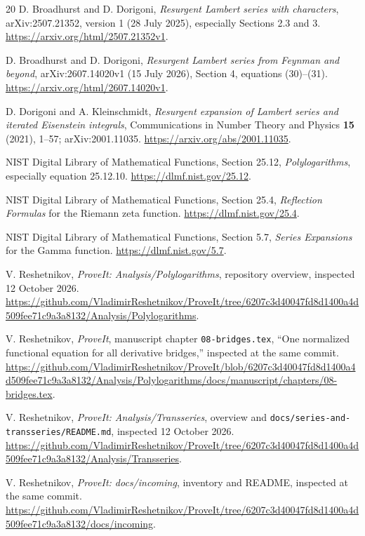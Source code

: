 \documentclass[11pt,a4paper]{article}
\numberwithin{equation}{section}
\theoremstyle{definition}\newtheorem{definition}[theorem]{Definition}
\theoremstyle{remark}\newtheorem{remark}[theorem]{Remark}
\begin{document}
\begin{thebibliography}{20}
D. Broadhurst and D. Dorigoni,
\emph{Resurgent Lambert series with characters},
arXiv:2507.21352, version 1 (28 July 2025), especially Sections 2.3 and 3.
\url{https://arxiv.org/html/2507.21352v1}.

D. Broadhurst and D. Dorigoni,
\emph{Resurgent Lambert series from Feynman and beyond},
arXiv:2607.14020v1 (15 July 2026), Section 4, equations (30)--(31).
\url{https://arxiv.org/html/2607.14020v1}.

D. Dorigoni and A. Kleinschmidt,
\emph{Resurgent expansion of Lambert series and iterated Eisenstein integrals},
Communications in Number Theory and Physics \textbf{15} (2021), 1--57;
arXiv:2001.11035.
\url{https://arxiv.org/abs/2001.11035}.

NIST Digital Library of Mathematical Functions, Section 25.12,
\emph{Polylogarithms}, especially equation 25.12.10.
\url{https://dlmf.nist.gov/25.12}.

NIST Digital Library of Mathematical Functions, Section 25.4,
\emph{Reflection Formulas} for the Riemann zeta function.
\url{https://dlmf.nist.gov/25.4}.

NIST Digital Library of Mathematical Functions, Section 5.7,
\emph{Series Expansions} for the Gamma function.
\url{https://dlmf.nist.gov/5.7}.

V. Reshetnikov, \emph{ProveIt: Analysis/Polylogarithms}, repository
overview, inspected 12 October 2026.
\url{https://github.com/VladimirReshetnikov/ProveIt/tree/6207c3d40047fd8d1400a4d509fee71c9a3a8132/Analysis/Polylogarithms}.

V. Reshetnikov, \emph{ProveIt}, manuscript chapter
\texttt{08-bridges.tex}, ``One normalized functional equation for all
derivative bridges,'' inspected at the same commit.
\url{https://github.com/VladimirReshetnikov/ProveIt/blob/6207c3d40047fd8d1400a4d509fee71c9a3a8132/Analysis/Polylogarithms/docs/manuscript/chapters/08-bridges.tex}.

V. Reshetnikov, \emph{ProveIt: Analysis/Transseries}, overview and
\texttt{docs/series-and-transseries/README.md}, inspected 12 October 2026.
\url{https://github.com/VladimirReshetnikov/ProveIt/tree/6207c3d40047fd8d1400a4d509fee71c9a3a8132/Analysis/Transseries}.

V. Reshetnikov, \emph{ProveIt: docs/incoming}, inventory and README,
inspected at the same commit.
\url{https://github.com/VladimirReshetnikov/ProveIt/tree/6207c3d40047fd8d1400a4d509fee71c9a3a8132/docs/incoming}.


\end{thebibliography}
\end{document}
